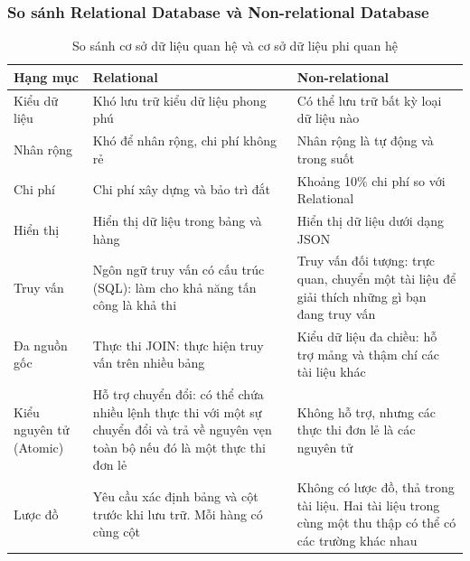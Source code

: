 \subsubsection{So sánh Relational Database và Non-relational Database}
\begin{table}[h]
\centering
\begin{tabular}{|l|l|l|} 
 \hline
 Hạng mục & Relational & Non-relational \\
 \hline
 \multicolumn{1}{|p{2cm}|}{Kiểu dữ liệu} & \multicolumn{1}{p{6cm}|}{Khó lưu trữ kiểu dữ liệu phong phú} & \multicolumn{1}{p{7cm}|}{Có thể lưu trữ bất kỳ loại dữ liệu nào}\\
 \hline
 \multicolumn{1}{|p{2cm}|}{Nhân rộng} & \multicolumn{1}{p{6cm}|}{Khó để nhân rộng, chi phí không rẻ} & \multicolumn{1}{p{7cm}|}{Nhân rộng là tự động và trong suốt}\\
 \hline
 \multicolumn{1}{|p{2cm}|}{Chi phí} & \multicolumn{1}{p{6cm}|}{Chi phí xây dựng và bảo trì đắt} & \multicolumn{1}{p{7cm}|}{Khoảng 10\% chi phí so với Relational}\\
 \hline
 \multicolumn{1}{|p{2cm}|}{Hiển thị} & \multicolumn{1}{p{6cm}|}{Hiển thị dữ liệu trong bảng và hàng} & \multicolumn{1}{p{7cm}|}{Hiển thị dữ liệu dưới dạng JSON}\\
 \hline
 \multicolumn{1}{|p{2cm}|}{Truy vấn} & \multicolumn{1}{p{6cm}|}{Ngôn ngữ truy vấn có cấu trúc (SQL): làm cho khả năng tấn công là khả thi} & \multicolumn{1}{p{7cm}|}{Truy vấn đối tượng: trực quan, chuyển một tài liệu để giải thích những gì bạn đang truy vấn}\\
 \hline
 \multicolumn{1}{|p{2cm}|}{Đa nguồn gốc} & \multicolumn{1}{p{6cm}|}{Thực thi JOIN: thực hiện truy vấn trên nhiều bảng} & \multicolumn{1}{p{7cm}|}{Kiểu dữ liệu đa chiều: hỗ trợ mảng và thậm chí các tài liệu khác}\\
 \hline
 \multicolumn{1}{|p{2cm}|}{Kiểu nguyên tử (Atomic)} & \multicolumn{1}{p{6cm}|}{Hỗ trợ chuyển đổi: có thể chứa nhiều lệnh thực thi với một sự chuyển đổi và trả về nguyên vẹn toàn bộ nếu đó là một thực thi đơn lẻ} & \multicolumn{1}{p{7cm}|}{Không hỗ trợ, nhưng các thực thi đơn lẻ là các nguyên tử}\\
 \hline
 \multicolumn{1}{|p{2cm}|}{Lược đồ} & \multicolumn{1}{p{6cm}|}{Yêu cầu xác định bảng và cột trước khi lưu trữ. Mỗi hàng có cùng cột} & \multicolumn{1}{p{7cm}|}{Không có lược đồ, thả trong tài liệu. Hai tài liệu trong cùng một thu thập có thể có các trường khác nhau}\\
 \hline
 \end{tabular}
 \caption{So sánh cơ sở dữ liệu quan hệ và cơ sở dữ liệu phi quan hệ}
 \label{tab:compare_dbms}
\end{table}
